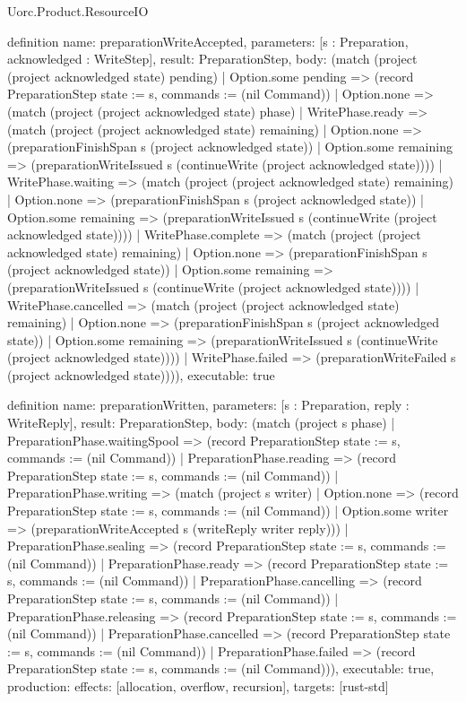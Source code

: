 \begin{lexlean}{Uorc.Product.ResourceIO}
\begin{semanticmodule}
definition{
  name: preparationWriteAccepted,
  parameters: [s : Preparation, acknowledged : WriteStep],
  result: PreparationStep,
  body: (match (project (project acknowledged state) pending)
    | Option.some pending => (record PreparationStep {state := s, commands := (nil Command)})
    | Option.none => (match (project (project acknowledged state) phase)
      | WritePhase.ready => (match (project (project acknowledged state) remaining)
        | Option.none => (preparationFinishSpan s (project acknowledged state))
        | Option.some remaining => (preparationWriteIssued s (continueWrite (project acknowledged state))))
      | WritePhase.waiting => (match (project (project acknowledged state) remaining)
        | Option.none => (preparationFinishSpan s (project acknowledged state))
        | Option.some remaining => (preparationWriteIssued s (continueWrite (project acknowledged state))))
      | WritePhase.complete => (match (project (project acknowledged state) remaining)
        | Option.none => (preparationFinishSpan s (project acknowledged state))
        | Option.some remaining => (preparationWriteIssued s (continueWrite (project acknowledged state))))
      | WritePhase.cancelled => (match (project (project acknowledged state) remaining)
        | Option.none => (preparationFinishSpan s (project acknowledged state))
        | Option.some remaining => (preparationWriteIssued s (continueWrite (project acknowledged state))))
      | WritePhase.failed => (preparationWriteFailed s (project acknowledged state)))),
  executable: true
}

definition{
  name: preparationWritten,
  parameters: [s : Preparation, reply : WriteReply],
  result: PreparationStep,
  body: (match (project s phase)
    | PreparationPhase.waitingSpool => (record PreparationStep {state := s, commands := (nil Command)})
    | PreparationPhase.reading => (record PreparationStep {state := s, commands := (nil Command)})
    | PreparationPhase.writing => (match (project s writer)
      | Option.none => (record PreparationStep {state := s, commands := (nil Command)})
      | Option.some writer => (preparationWriteAccepted s (writeReply writer reply)))
    | PreparationPhase.sealing => (record PreparationStep {state := s, commands := (nil Command)})
    | PreparationPhase.ready => (record PreparationStep {state := s, commands := (nil Command)})
    | PreparationPhase.cancelling => (record PreparationStep {state := s, commands := (nil Command)})
    | PreparationPhase.releasing => (record PreparationStep {state := s, commands := (nil Command)})
    | PreparationPhase.cancelled => (record PreparationStep {state := s, commands := (nil Command)})
    | PreparationPhase.failed => (record PreparationStep {state := s, commands := (nil Command)})),
  executable: true,
  production: {effects: [allocation, overflow, recursion], targets: [rust-std]}
}


\end{semanticmodule}
\end{lexlean}
